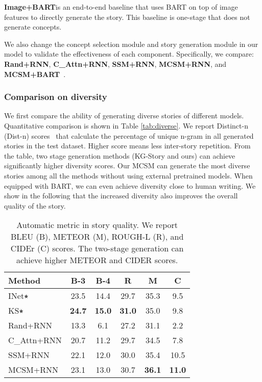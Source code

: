 \noindent\textbf{Image+BART}\dag is an end-to-end baseline that uses BART on top of image features to directly generate the story. This baseline is one-stage that does not generate concepts.

We also change the concept selection module and story generation module in our model to validate the effectiveness of each component. Specifically, we compare: \textbf{Rand+RNN}, \textbf{C\_Attn+RNN}, \textbf{SSM+RNN}, \textbf{MCSM+RNN}, and \textbf{MCSM+BART}\dag~.

\subsubsection{Comparison on diversity}
We first compare the ability of generating diverse stories of different models. Quantitative comparison is shown in Table \ref{tab:diverse}. We report Distinct-n (Dist-n) scores~\cite{li2015dist} that calculate the percentage of unique n-gram in all generated stories in the test dataset. Higher score means less inter-story repetition. 
From the table, two stage generation methods (KG-Story and ours) can achieve significantly higher diversity scores. 
Our MCSM can generate the most diverse stories among all the methods without using external pretrained models.
When equipped with BART, we can even achieve diversity close to human writing.
We show in the following that the increased diversity also improves the overall quality of the story.

\begin{table}[t]
\centering
\begin{tabular}{l|c|c|c|c|c}
\hline
 Method& B-3& B-4 & R& M & C\\\hline\hline
 INet$\smwhitestar$& 23.5&14.4&29.7&35.3&9.5\\\hline
 KS$\smwhitestar$&\textbf{24.7}&\textbf{15.0}&\textbf{31.0}&35.0&9.8\\\hline
 \hline
 Rand+RNN&  13.3&6.1&27.2&31.1&2.2\\\hline
 C\_Attn+RNN&20.7&11.2&29.7&34.5&7.8\\\hline
 SSM+RNN &22.1&12.0&30.0&35.4&10.5\\\hline
 MCSM+RNN&23.1&13.0&30.7&\textbf{36.1}&\textbf{11.0}\\
 \hline
\end{tabular}
\caption{Automatic metric in story quality. We report BLEU (B), METEOR (M), ROUGH-L (R), and CIDEr (C) scores. The two-stage generation can achieve higher METEOR and CIDER scores.}
\label{tab:am}
\end{table}



